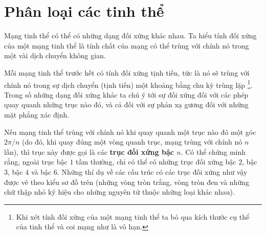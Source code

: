 \section{Phân loại các tinh thể}\label{sec:13_2}


Mạng tinh thể có thể có những dạng đối xứng khác nhau. Ta hiểu tính đối xứng của một mạng tinh thể là tính chất của mạng có thể trùng với chính nó trong một vài dịch chuyển không gian.


Mỗi mạng tinh thể trước hết có tính đối xứng tịnh tiến, tức là nó sẽ trùng với chính nó trong sự dịch chuyển (tịnh tiến) một khoảng bằng chu kỳ trùng lặp \footnote{Khi xét tính đối xứng của một mạng tinh thể ta bỏ qua kích thước cụ thể của tinh thể và coi mạng như là vô hạn.}. Trong số những dạng đối xứng khác ta chú ý tới sự đối xứng đối với các phép quay quanh những trục nào đó, và cả đối với sự phản xạ gương đối với những mặt phẳng xác định.


Nếu mạng tinh thể trùng với chính nó khi quay quanh một trục nào đó một góc $2\pi/n$ (do đó, khi quay đúng một vòng quanh trục, mạng trùng với chính nó $n$ lần), thì trục này được gọi là các \textbf{trục đối xứng bậc $n$}. Có thể chứng minh rằng, ngoài trục bậc $1$ tầm thường, chỉ có thể có những trục đối xứng bậc $2$, bậc $3$, bậc $4$ và bậc $6$. Những thí dụ về các cấu trúc có các trục đối xứng như vậy được vẽ theo kiểu sơ đồ trên  (những vòng tròn trắng, vòng tròn đen và những chữ thập nhỏ ký hiệu cho những nguyên tử thuộc những loại khác nhau).

